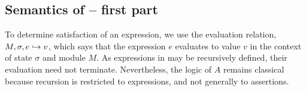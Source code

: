 \subsection{Semantics of \AssertLang -- first part}
\label{sect:semantics:assert:standard}

To determine satisfaction of an expression, we    use the evaluation relation, $M, \sigma, e \hookrightarrow v$,
which says that the expression $e$ evaluates
to value $v$ in the context of state $\sigma$ and module $M$.
As expressions in \LangOO may be recursively defined, their evaluation 
need not   %
 terminate. Nevertheless, the logic of $A$ remains classical because recursion is restricted
to expressions, and not generally to assertions.


